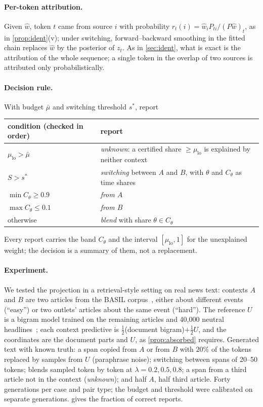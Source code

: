 \paragraph{Per-token attribution.} Given $\hat w$, token $t$ came from source $i$ with probability
$r_t(i)=\hat w_iP_{ti}/(P\hat w)_t$, as in \cref{prop:ident}(v); under switching, forward--backward
smoothing in the fitted chain replaces $\hat w$ by the posterior of $z_t$. As in \cref{sec:ident},
what is exact is the attribution of the whole sequence; a single token in the overlap of two
sources is attributed only probabilistically.

\paragraph{Decision rule.} With budget $\bar\mu$ and switching threshold $s^*$, report
\begin{center}
\begin{tabular}{@{}ll@{}}
\toprule
condition (checked in order) & report\\
\midrule
$\mu_{\mathrm{lo}}>\bar\mu$ & \emph{unknown}: a certified share $\ge\mu_{\mathrm{lo}}$ is explained by neither context\\
$S>s^*$ & \emph{switching} between $A$ and $B$, with $\theta$ and $C_\theta$ as time shares\\
$\min C_\theta\ge0.9$ & \emph{from $A$}\\
$\max C_\theta\le0.1$ & \emph{from $B$}\\
otherwise & \emph{blend} with share $\theta\in C_\theta$\\
\bottomrule
\end{tabular}
\end{center}
Every report carries the band $C_\theta$ and the interval $[\mu_{\mathrm{lo}},1]$ for the unexplained
weight; the decision is a summary of them, not a replacement.

\paragraph{Experiment.} We tested the projection in a retrieval-style setting on real news text:
contexts $A$ and $B$ are two articles from the BASIL corpus~\cite{BASIL2019}, either about different
events (``easy'') or two outlets' articles about the same event (``hard''). The reference $U$ is a
bigram model trained on the remaining articles and 40{,}000 neutral headlines~\cite{BABE2021}; each
context predictive is $\tfrac12$(document bigram)$+\tfrac12U$, and the coordinates are the
document parts and $U$, as \cref{prop:absorbed} requires. Generated text with known truth: a span
copied from $A$ or from $B$ with $20\%$ of the tokens replaced by samples from $U$ (paraphrase noise);
switching between spans of 20--50 tokens; blends sampled token by token at $\lambda=0.2,0.5,0.8$; a
span from a third article not in the context (\emph{unknown}); and half $A$, half third article.
Forty generations per case and pair type; the budget and threshold were calibrated on separate
generations.  gives the fraction of correct reports.

